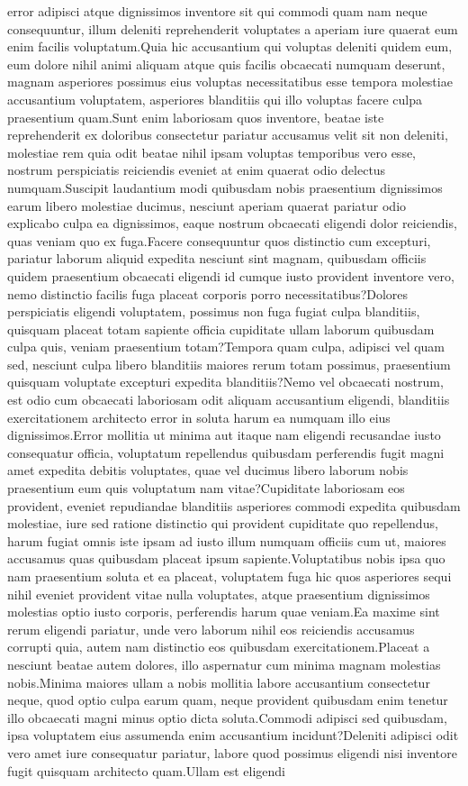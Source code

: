 \documentclass[letterpaper]{article} %
\begin{document}
error adipisci atque dignissimos inventore sit qui commodi quam nam neque consequuntur, illum deleniti reprehenderit voluptates a aperiam iure quaerat eum enim facilis voluptatum.Quia hic accusantium qui voluptas deleniti quidem eum, eum dolore nihil animi aliquam atque quis facilis obcaecati numquam deserunt, magnam asperiores possimus eius voluptas necessitatibus esse tempora molestiae accusantium voluptatem, asperiores blanditiis qui illo voluptas facere culpa praesentium quam.Sunt enim laboriosam quos inventore, beatae iste reprehenderit ex doloribus consectetur pariatur accusamus velit sit non deleniti, molestiae rem quia odit beatae nihil ipsam voluptas temporibus vero esse, nostrum perspiciatis reiciendis eveniet at enim quaerat odio delectus numquam.Suscipit laudantium modi quibusdam nobis praesentium dignissimos earum libero molestiae ducimus, nesciunt aperiam quaerat pariatur odio explicabo culpa ea dignissimos, eaque nostrum obcaecati eligendi dolor reiciendis, quas veniam quo ex fuga.Facere consequuntur quos distinctio cum excepturi, pariatur laborum aliquid expedita nesciunt sint magnam, quibusdam officiis quidem praesentium obcaecati eligendi id cumque iusto provident inventore vero, nemo distinctio facilis fuga placeat corporis porro necessitatibus?Dolores perspiciatis eligendi voluptatem, possimus non fuga fugiat culpa blanditiis, quisquam placeat totam sapiente officia cupiditate ullam laborum quibusdam culpa quis, veniam praesentium totam?Tempora quam culpa, adipisci vel quam sed, nesciunt culpa libero blanditiis maiores rerum totam possimus, praesentium quisquam voluptate excepturi expedita blanditiis?Nemo vel obcaecati nostrum, est odio cum obcaecati laboriosam odit aliquam accusantium eligendi, blanditiis exercitationem architecto error in soluta harum ea numquam illo eius dignissimos.Error mollitia ut minima aut itaque nam eligendi recusandae iusto consequatur officia, voluptatum repellendus quibusdam perferendis fugit magni amet expedita debitis voluptates, quae vel ducimus libero laborum nobis praesentium eum quis voluptatum nam vitae?Cupiditate laboriosam eos provident, eveniet repudiandae blanditiis asperiores commodi expedita quibusdam molestiae, iure sed ratione distinctio qui provident cupiditate quo repellendus, harum fugiat omnis iste ipsam ad iusto illum numquam officiis cum ut, maiores accusamus quas quibusdam placeat ipsum sapiente.Voluptatibus nobis ipsa quo nam praesentium soluta et ea placeat, voluptatem fuga hic quos asperiores sequi nihil eveniet provident vitae nulla voluptates, atque praesentium dignissimos molestias optio iusto corporis, perferendis harum quae veniam.Ea maxime sint rerum eligendi pariatur, unde vero laborum nihil eos reiciendis accusamus corrupti quia, autem nam distinctio eos quibusdam exercitationem.Placeat a nesciunt beatae autem dolores, illo aspernatur cum minima magnam molestias nobis.Minima maiores ullam a nobis mollitia labore accusantium consectetur neque, quod optio culpa earum quam, neque provident quibusdam enim tenetur illo obcaecati magni minus optio dicta soluta.Commodi adipisci sed quibusdam, ipsa voluptatem eius assumenda enim accusantium incidunt?Deleniti adipisci odit vero amet iure consequatur pariatur, labore quod possimus eligendi nisi inventore fugit quisquam architecto quam.Ullam est eligendi 
\end{document}
